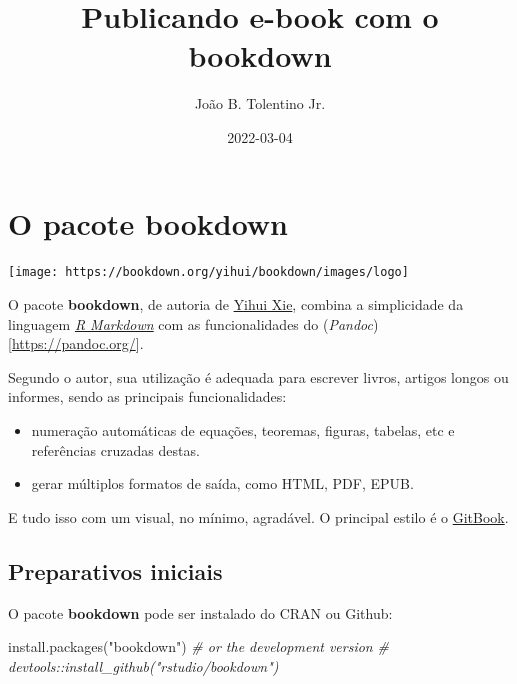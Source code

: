 \documentclass[
]{book}
\title{Publicando e-book com o bookdown}
\author{João B. Tolentino Jr.}
\date{2022-03-04}
\newenvironment{Shaded}{\begin{snugshade}}{\end{snugshade}}
\newcommand{\CommentTok}[1]{\textcolor[rgb]{0.56,0.35,0.01}{\textit{#1}}}
\newcommand{\FunctionTok}[1]{\textcolor[rgb]{0.00,0.00,0.00}{#1}}
\newcommand{\NormalTok}[1]{#1}
\newcommand{\StringTok}[1]{\textcolor[rgb]{0.31,0.60,0.02}{#1}}
\providecommand{\tightlist}{%
  \setlength{\itemsep}{0pt}\setlength{\parskip}{0pt}}
\begin{document}
\maketitle

{
\setcounter{tocdepth}{1}
\tableofcontents
}
\hypertarget{o-pacote-bookdown}{%
\chapter{\texorpdfstring{O pacote \textbf{bookdown}}{O pacote bookdown}}\label{o-pacote-bookdown}}

\begin{center}\texttt{[image: https://bookdown.org/yihui/bookdown/images/logo]} \end{center}

O pacote \textbf{bookdown}, de autoria de \href{https://yihui.org}{Yihui Xie}, combina a simplicidade da linguagem \href{http://rmarkdown.rstudio.com/}{\emph{R Markdown}} com as funcionalidades do (\emph{Pandoc}){[}\url{https://pandoc.org/}{]}.

Segundo o autor, sua utilização é adequada para escrever livros, artigos longos ou informes, sendo as principais funcionalidades:

\begin{itemize}
\tightlist
\item
  numeração automáticas de equações, teoremas, figuras, tabelas, etc e referências cruzadas destas.
\item
  gerar múltiplos formatos de saída, como HTML, PDF, EPUB.
\end{itemize}

E tudo isso com um visual, no mínimo, agradável. O principal estilo é o \href{https://www.gitbook.com/}{GitBook}.

\hypertarget{preparativos-iniciais}{%
\section{Preparativos iniciais}\label{preparativos-iniciais}}

O pacote \textbf{bookdown} pode ser instalado do CRAN ou Github:

\begin{Shaded}
\begin{Highlighting}[]
\FunctionTok{install.packages}\NormalTok{(}\StringTok{"bookdown"}\NormalTok{)}
\CommentTok{\# or the development version}
\CommentTok{\# devtools::install\_github("rstudio/bookdown")}
\end{Highlighting}
\end{Shaded}
\end{document}

